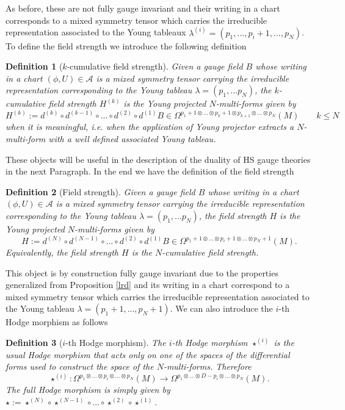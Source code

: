 \documentclass[a4paper,12pt]{article}
\newtheorem{Definition}{Definition}[section]
\begin{document}
As before, these are not fully gauge invariant and their writing in a chart corresponds to a mixed symmetry tensor which carries the irreducible representation associated to the Young tableaux $\lambda^{(i)}=(p_1,...,p_i+1,...,p_N)$. To define the field strength we introduce the following definition 
\begin{Definition}[$k$-cumulative field strength]
\textit{Given a gauge field $B$ whose writing in a chart $(\phi,U) \in \mathcal{A}$ is a mixed symmetry tensor carrying the irreducible representation corresponding to the Young tableau $\lambda=(p_1,...p_N)$, the $k$-cumulative field strength $H^{(k)}$ is the Young projected $N$-multi-forms given by}
    \begin{equation}
        H^{(k)}:=d^{(k)} \circ d^{(k-1)} \circ ... \circ d^{(2)} \circ d^{(1)}B \in \Omega^{p_1+1 \otimes ... \otimes p_k+1 \otimes p_{k+1} \otimes ... \otimes p_N}(M) \qquad k\leq N
    \end{equation} 
when it is meaningful, i.e. when the application of Young projector extracts a $N$-multi-form with a well defined associated Young tableau.
\end{Definition}
These objects will be useful in the description of the duality of HS gauge theories in the next Paragraph. In the end we have the definition of the field strength
\begin{Definition}[Field strength]\label{def2.5.10}
    \textit{Given a gauge field $B$ whose writing in a chart $(\phi,U) \in \mathcal{A}$ is a mixed symmetry tensor carrying the irreducible representation corresponding to the Young tableau $\lambda=(p_1,...p_N)$, the field strength $H$ is the Young projected $N$-multi-forms given by}
    \begin{equation}
        H:=d^{(N)} \circ d^{(N-1)} \circ ... \circ d^{(2)} \circ d^{(1)}B \in \Omega^{p_1+1 \otimes ... \otimes p_i+1 \otimes ... \otimes p_N+1}(M).
    \end{equation}
\textit{Equivalently, the field strength $H$ is the $N$-cumulative field strength.}
\end{Definition}
This object is by construction fully gauge invariant due to the properties generalized from Proposition \ref{lrd} and its writing in a chart correspond to a mixed symmetry tensor which carries the irreducible representation associated to the Young tableau $\lambda=(p_1+1,...,p_N+1)$. We can also introduce the $i$-th Hodge morphism as follows
\begin{Definition}[$i$-th Hodge morphism]
\textit{The $i$-th Hodge morphism $\star^{(i)}$ is the usual Hodge morphism that acts only on one of the spaces of the differential forms used to construct the space of the $N$-multi-forms. Therefore}
    \begin{equation}
        \star^{(i)}: \Omega^{p_1 \otimes ... \otimes p_i \otimes ... \otimes p_N}(M) \rightarrow  \Omega^{p_1 \otimes ... \otimes D-p_i \otimes ... \otimes p_N}(M).
    \end{equation}
 \textit{The full Hodge morphism is simply given by $\star:=\star^{(N)} \circ \star^{(N-1)} \circ ... \circ \star^{(2)} \circ \star^{(1)}$.}    
\end{Definition}
\end{document}
